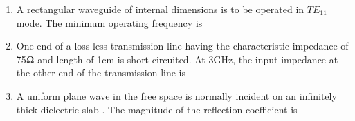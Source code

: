 \documentclass[a4paper, 11pt]{article}
\begin{document}
\begin{enumerate}
    \hfill{}
    
    \item A rectangular waveguide of internal dimensions  is to be operated in $TE_{11}$ mode. The minimum operating frequency is
    \begin{enumerate}
    \end{enumerate}
    
    \hfill{}
    
    \item One end of a loss-less transmission line having the characteristic impedance of 75$\ohm$ and length of 1cm is short-circuited. At 3GHz, the input impedance at the other end of the transmission line is
    \begin{enumerate}
    \end{enumerate}
    
    \hfill{}
    
    \item A uniform plane wave in the free space is normally incident on an infinitely thick dielectric slab . The magnitude of the reflection coefficient is
    \begin{enumerate}
    \end{enumerate}
    

\end{enumerate}
\end{document}
